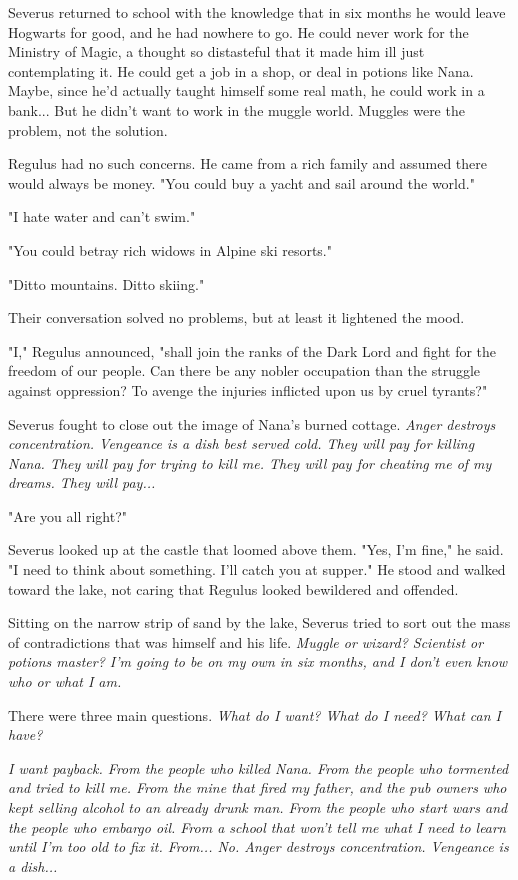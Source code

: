 \documentclass[a4paper,11pt]{article}
\begin{document}
Severus returned to school with the knowledge that in six months he would leave Hogwarts for good, and he had nowhere to go. He could never work for the Ministry of Magic, a thought so distasteful that it made him ill just contemplating it. He could get a job in a shop, or deal in potions like Nana. Maybe, since he'd actually taught himself some real math, he could work in a bank... But he didn't want to work in the muggle world. Muggles were the problem, not the solution.

Regulus had no such concerns. He came from a rich family and assumed there would always be money. "You could buy a yacht and sail around the world."

"I hate water and can't swim."

"You could betray rich widows in Alpine ski resorts."

"Ditto mountains. Ditto skiing."

Their conversation solved no problems, but at least it lightened the mood.

"I," Regulus announced, "shall join the ranks of the Dark Lord and fight for the freedom of our people. Can there be any nobler occupation than the struggle against oppression? To avenge the injuries inflicted upon us by cruel tyrants?"

Severus fought to close out the image of Nana's burned cottage. \emph{Anger destroys concentration. Vengeance is a dish best served cold. They will pay for killing Nana. They will pay for trying to kill me. They will pay for cheating me of my dreams. They will pay...}

"Are you all right?"

Severus looked up at the castle that loomed above them. "Yes, I'm fine," he said. "I need to think about something. I'll catch you at supper." He stood and walked toward the lake, not caring that Regulus looked bewildered and offended.

Sitting on the narrow strip of sand by the lake, Severus tried to sort out the mass of contradictions that was himself and his life. \emph{Muggle or wizard? Scientist or potions master? I'm going to be on my own in six months, and I don't even know who or what I am.}

There were three main questions. \emph{What do I want? What do I need? What can I have?}

\emph{I want payback. From the people who killed Nana. From the people who tormented and tried to kill me. From the mine that fired my father, and the pub owners who kept selling alcohol to an already drunk man. From the people who start wars and the people who embargo oil. From a school that won't tell me what I need to learn until I'm too old to fix it. From... No. Anger destroys concentration. Vengeance is a dish...}
\end{document}
